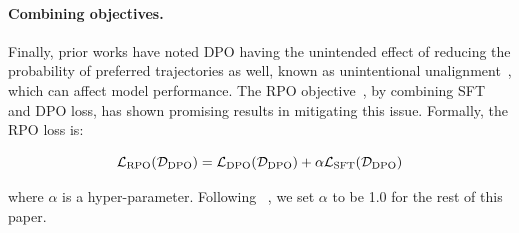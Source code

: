 \paragraph{Combining objectives.} 

Finally, prior works have noted DPO having the unintended effect of reducing the probability of preferred trajectories as well, known as unintentional unalignment~\citep{razin2024unintentionalunalignmentlikelihooddisplacement}, which can affect model performance. The RPO objective~\citep{pang2024iterativereasoningpreferenceoptimization}, by combining SFT and DPO loss, has shown promising results in mitigating this issue. Formally, the RPO loss is:

\begin{equation} \label{eq:rpo_formula}
    \mathcal{L}_{\text{RPO}}(\mathcal{D}_\text{DPO}) = \mathcal{L}_\text{DPO}({\mathcal{D}}_\text{DPO}) + \alpha \mathcal{L}_\text{SFT}({\mathcal{D}}_\text{DPO})
\end{equation}

where $\alpha$ is a hyper-parameter. Following ~\citet{pang2024iterativereasoningpreferenceoptimization}, we set $\alpha$ to be 1.0 for the rest of this paper.

